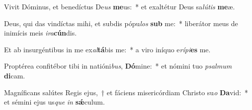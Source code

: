 \item Vivit Dóminus, et benedíctus De\textit{us} \textbf{me}us:~* et exaltétur Deus sa\textit{lú}\textit{tis} \textbf{me}æ.
\item Deus, qui das vindíctas mihi, et subdis pópu\textit{los} \textbf{sub} me:~* liberátor meus de inimícis meis \textit{i}\textit{ra}\textbf{cún}dis.
\item Et ab insurgéntibus in me ex\textit{al}\textbf{tá}bis me:~* a viro iníquo e\textit{rí}\textit{pi}\textbf{es} me.
\item Proptérea confitébor tibi in natióni\textit{bus}, \textbf{Dó}mine:~* et nómini tuo \textit{psal}\textit{mum} \textbf{di}cam.
\item Magníficans salútes Regis ejus,~† et fáciens misericórdiam Christo su\textit{o} \textbf{Da}vid:~* et sémini ejus us\textit{que} \textit{in} \textbf{sǽ}culum.
